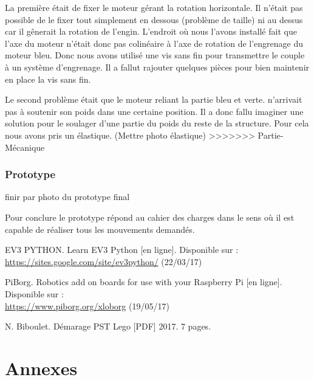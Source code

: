 \documentclass[twoside,twocolumn, 16pt]{article}
\begin{document}
La première était de fixer le moteur gérant la rotation horizontale. 
Il n’était pas possible de le fixer tout simplement en dessous (problème de taille) ni au dessus car il gênerait la rotation de l’engin. L’endroit où nous l’avons installé fait que l’axe du moteur n’était donc pas colinéaire à l’axe de rotation de l’engrenage du moteur bleu. Donc nous avons utilisé une vis sans fin pour transmettre le couple à un système d’engrenage. Il a fallut rajouter quelques pièces pour bien maintenir en place la vis sans fin. 

Le second problème était que le moteur reliant la partie bleu et verte. n’arrivait pas à soutenir son poids dans une certaine position. Il a donc fallu imaginer une solution pour le soulager d’une partie du poids du reste de la structure.
Pour cela nous avons pris un élastique. (Mettre photo élastique)
>>>>>>> Partie-Mécanique

\subsubsection{Prototype}
finir par photo du prototype final

Pour conclure le prototype répond au cahier des charges dans le sens où il est capable de réaliser tous les mouvements demandés.


\begin{thebibliography}{99} %

EV3 PYTHON. Learn EV3 Python [en ligne]. Disponible sur : \\\url{https://sites.google.com/site/ev3python/} (22/03/17)

PiBorg. Robotics add on boards for use with your Raspberry Pi [en ligne]. Disponible sur : \\
\url{https://www.piborg.org/xloborg} (19/05/17)
 
 N. Biboulet. Démarage PST Lego [PDF] 2017. 7 pages.
\end{thebibliography}

\newpage
\section{Annexes}
\end{document}
